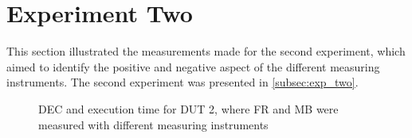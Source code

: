 \section{Experiment Two}\label{app:exp_two}

This section illustrated the measurements made for the second experiment, which aimed to identify the positive and negative aspect of the different measuring instruments. The second experiment was presented in \cref{subsec:exp_two}.

\begin{figure}[H]
    \centering
    \begin{subfigure}[b]{0.4\textwidth}
        \centering
        
    \end{subfigure}
    \hfill
    \begin{subfigure}[b]{0.4\textwidth}
        \centering
        
    \end{subfigure}
    \caption{DEC and execution time for DUT 2, where FR and MB were measured with different measuring instruments}
\end{figure}





% 
% 

% 
% 
% 

